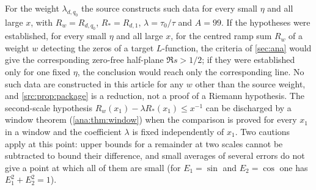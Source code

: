 For the weight $\lambda_{d,q_0}$ the source constructs such data for every small $\eta$ and all
large $x$, with $R_w=R_{d,q_0}$, $R_*=R_{d,1}$, $\lambda=\tau_0/\tau$ and $A=99$. If the
hypotheses were established, for every small $\eta$ and all large $x$, for the centred ramp
sum $R_w$ of a weight $w$ detecting the zeros of a target $L$-function, the criteria of
\cref{sec:ana} would give the corresponding zero-free half-plane $\Re s>1/2$; if they were
established only for one fixed $\eta$, the conclusion would reach only the corresponding
line. No such data are constructed in this article for any $w$ other than the source weight,
and \cref{src:prop:package} is a reduction, not a proof of a Riemann hypothesis. The
second-scale hypothesis $R_w(x_1)-\lambda R_*(x_1)\le x^{-1}$ can be discharged by a window
theorem (\cref{ana:thm:window}) when the comparison is proved for every $x_1$ in a window and
the coefficient $\lambda$ is fixed independently of $x_1$. Two cautions apply at this point:
upper bounds for a remainder at two scales cannot be subtracted to bound their difference, and
small averages of several errors do not give a point at which all of them are small (for
$E_1=\sin$ and $E_2=\cos$ one has $E_1^2+E_2^2=1$).

